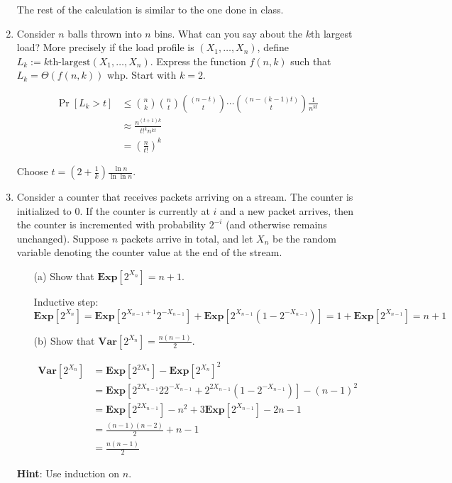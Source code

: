 \documentclass[11pt]{article}
\begin{document}
\begin{enumerate}
The rest of the calculation is similar to the one done in class.


\item Consider $n$ balls thrown into $n$ bins. What can you say about the $k$th largest load?
More precisely if the load profile is $(X_1,\ldots,X_n)$, define
$L_k := \textrm{$k$th-largest}(X_1,\ldots,X_n).$
Express the function $f(n,k)$ such that $L_k = \Theta(f(n,k))$ whp. %
Start with $k=2$. 

\Sol

\begin{align*}
 \Pr[L_k > t] &\le {n\choose k} {n\choose t} {(n-t)\choose t} \cdots {(n-(k-1)t)\choose t} \frac{1}{n^{kt}}\\
 &\approx \frac{n^{(t+1)k}}{t!^k n^{kt}}\\
 &= \left( \frac{n}{t!} \right)^k
\end{align*}

Choose $t = (2+\frac{1}{k}) \frac{\ln n}{\ln \ln n}$.


\item
Consider a counter that receives packets arriving on a stream. The counter is initialized to $0$. If the counter is currently at $i$ and a new packet arrives, then the counter is incremented with probability $2^{-i}$ (and otherwise remains unchanged). Suppose $n$ packets arrive in total, and let $X_n$ be the random variable denoting the counter value at the end of the stream.
\begin{enumerate}
\item[(a)]
Show that $\mathbf{Exp}[2^{X_n}] = n+1$. 

\Sol

Inductive step: $\mathbf{Exp}[2^{X_n}] = \mathbf{Exp}[2^{X_{n-1}+1} 2^{-X_{n-1}}] + \mathbf{Exp}[2^{X_{n-1}} (1-2^{-X_{n-1}})] = 1 + \mathbf{Exp}[2^{X_{n-1}}] = n+1$
\item[(b)]
Show that $\mathbf{Var}[2^{X_n}] = \frac{n(n-1)}{2}$.

\Sol

\begin{align*}
 \mathbf{Var}[2^{X_n}] &= \mathbf{Exp}[2^{2X_n}] - \mathbf{Exp}[2^{X_n}]^2\\
 &= \mathbf{Exp}\left[2^{2X_{n-1}} 2 2^{-X_{n-1}} + 2^{2X_{n-1}}\left(1- 2^{-X_{n-1}}\right)\right] - (n-1)^2\\
 &= \mathbf{Exp}[2^{2X_{n-1}}] - n^2 + 3\mathbf{Exp}[2^{X_{n-1}}] - 2n - 1\\
 &= \frac{(n-1)(n-2)}{2} + n-1\\
 &=\frac{n(n-1)}{2}
\end{align*}

\end{enumerate}

\noindent \textbf{Hint}: Use induction on $n$.
\end{enumerate}
\end{document}
